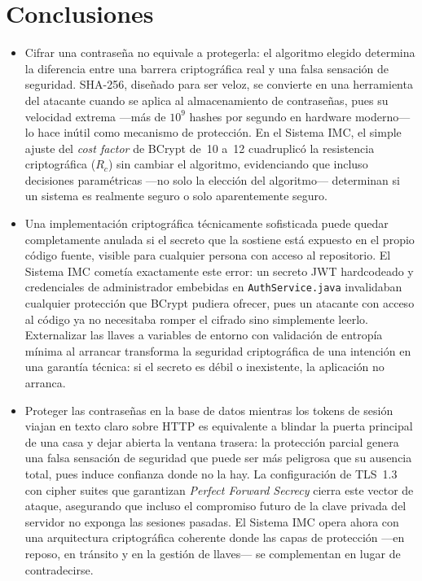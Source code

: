 \section*{Conclusiones}

\begin{itemize}
    \item Cifrar una contraseña no equivale a protegerla: el algoritmo elegido determina la
          diferencia entre una barrera criptográfica real y una falsa sensación de seguridad.
          SHA-256, diseñado para ser veloz, se convierte en una herramienta del atacante cuando
          se aplica al almacenamiento de contraseñas, pues su velocidad extrema ---más de $10^9$
          hashes por segundo en hardware moderno--- lo hace inútil como mecanismo de protección.
          En el Sistema IMC, el simple ajuste del \textit{cost factor} de BCrypt de~10 a~12
          cuadruplicó la resistencia criptográfica ($R_c$) sin cambiar el algoritmo, evidenciando
          que incluso decisiones paramétricas ---no solo la elección del algoritmo--- determinan
          si un sistema es realmente seguro o solo aparentemente seguro.

    \item Una implementación criptográfica técnicamente sofisticada puede quedar completamente
          anulada si el secreto que la sostiene está expuesto en el propio código fuente, visible
          para cualquier persona con acceso al repositorio. El Sistema IMC cometía exactamente
          este error: un secreto JWT hardcodeado y credenciales de administrador embebidas en
          \texttt{AuthService.java} invalidaban cualquier protección que BCrypt pudiera ofrecer,
          pues un atacante con acceso al código ya no necesitaba romper el cifrado sino simplemente
          leerlo. Externalizar las llaves a variables de entorno con validación de entropía mínima
          al arrancar transforma la seguridad criptográfica de una intención en una garantía
          técnica: si el secreto es débil o inexistente, la aplicación no arranca.

    \item Proteger las contraseñas en la base de datos mientras los tokens de sesión viajan en
          texto claro sobre HTTP es equivalente a blindar la puerta principal de una casa y dejar
          abierta la ventana trasera: la protección parcial genera una falsa sensación de seguridad
          que puede ser más peligrosa que su ausencia total, pues induce confianza donde no la hay.
          La configuración de TLS~1.3 con cipher suites que garantizan \textit{Perfect Forward
          Secrecy} cierra este vector de ataque, asegurando que incluso el compromiso futuro de
          la clave privada del servidor no exponga las sesiones pasadas. El Sistema IMC opera
          ahora con una arquitectura criptográfica coherente donde las capas de protección ---en
          reposo, en tránsito y en la gestión de llaves--- se complementan en lugar de
          contradecirse.
\end{itemize}
